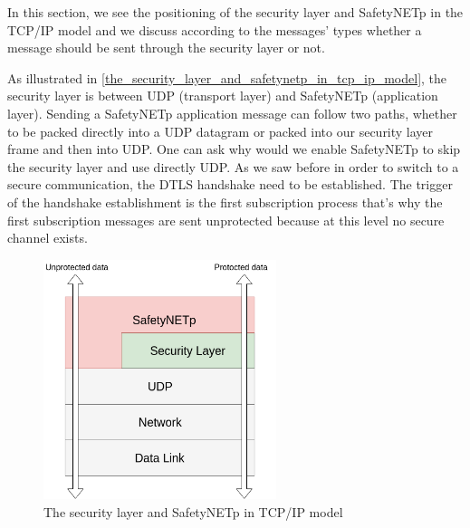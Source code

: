 In this section, we see the positioning of the security layer and SafetyNETp in the TCP/IP model
and we discuss according to the messages' types whether a message should be sent through the security layer
or not.

As illustrated in \autoref{the_security_layer_and_safetynetp_in_tcp_ip_model}, the security layer is between UDP (transport layer) and SafetyNETp (application layer).
Sending a SafetyNETp application message can follow two paths, whether to be packed directly into a UDP datagram
or packed into our security layer frame and then into UDP. One can ask why would we enable SafetyNETp to skip the security layer
and use directly UDP. As we saw before in order to switch to a secure communication, the DTLS handshake need to be established.
The trigger of the handshake establishment is the first subscription process that's why the first subscription messages are sent
unprotected because at this level no secure channel exists.

\begin{figure}[H]
\centering
\includegraphics[height=7cm]{figures/design/the_security_layer_and_safetynetp_in_tcp_ip_model.png}
\caption{The security layer and SafetyNETp in TCP/IP model}\label{the_security_layer_and_safetynetp_in_tcp_ip_model}
\end{figure}

